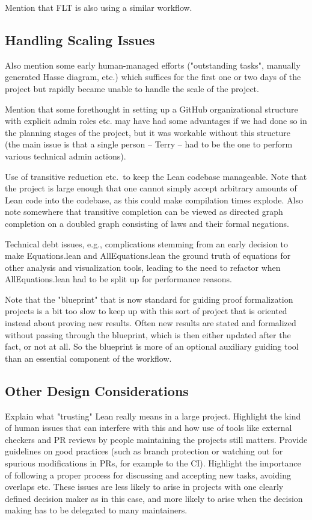 Mention that FLT is also using a similar workflow.

\subsection{Handling Scaling Issues}

Also mention some early human-managed efforts ("outstanding tasks", manually generated Hasse diagram, etc.) which suffices for the first one or two days of the project but rapidly became unable to handle the scale of the project.

Mention that some forethought in setting up a GitHub organizational structure with explicit admin roles etc. may have had some advantages if we had done so in the planning stages of the project, but it was workable without this structure (the main issue is that a single person -- Terry -- had to be the one to perform various technical admin actions).

Use of transitive reduction etc.\ to keep the Lean codebase manageable. Note that the project is large enough that one cannot simply accept arbitrary amounts of Lean code into the codebase, as this could make compilation times explode. Also note somewhere that transitive completion can be viewed as directed graph completion on a doubled graph consisting of laws and their formal negations.

Technical debt issues, e.g., complications stemming from an early decision to make Equations.lean and AllEquations.lean the ground truth of equations for other analysis and visualization tools, leading to the need to refactor when AllEquations.lean had to be split up for performance reasons.

Note that the "blueprint" that is now standard for guiding proof formalization projects is a bit too slow to keep up with this sort of project that is oriented instead about proving new results. Often new results are stated and formalized without passing through the blueprint, which is then either updated after the fact, or not at all. So the blueprint is more of an optional auxiliary guiding tool than an essential component of the workflow.

\subsection{Other Design Considerations}

Explain what "trusting" Lean really means in a large project. Highlight the kind of human issues that can interfere with this and how use of tools like external checkers and PR reviews by people maintaining the projects still matters. Provide guidelines on good practices (such as branch protection or watching out for spurious modifications in PRs, for example to the CI). Highlight the importance of following a proper process for discussing and accepting new tasks, avoiding overlaps etc. These issues are less likely to arise in projects with one clearly defined decision maker as in this case, and more likely to arise when the decision making has to be delegated to many maintainers.

